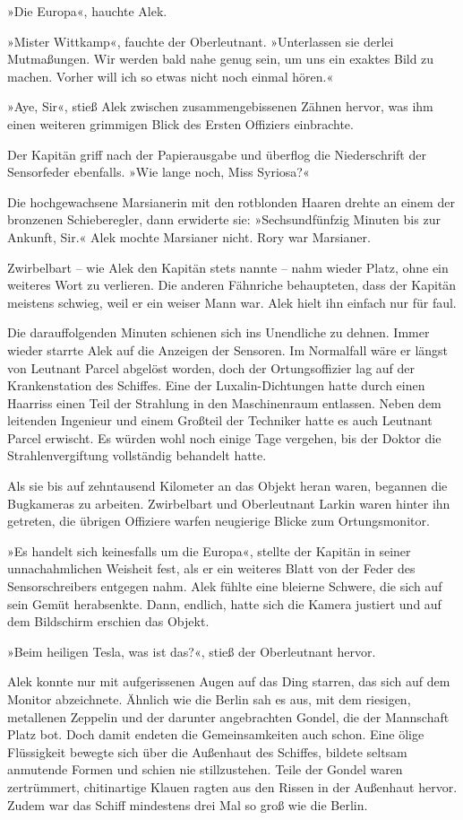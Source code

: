 »Die Europa«, hauchte Alek.

»Mister Wittkamp«, fauchte der Oberleutnant. »Unterlassen sie
derlei Mutmaßungen. Wir werden bald nahe genug sein, um uns ein
exaktes Bild zu machen. Vorher will ich so etwas nicht noch einmal
hören.«

»Aye, Sir«, stieß Alek zwischen zusammengebissenen Zähnen hervor,
was ihm einen weiteren grimmigen Blick des Ersten Offiziers
einbrachte.

Der Kapitän griff nach der Papierausgabe und überflog die
Niederschrift der Sensorfeder ebenfalls. »Wie lange noch, Miss
Syriosa?«

Die hochgewachsene Marsianerin mit den rotblonden Haaren drehte an
einem der bronzenen Schieberegler, dann erwiderte sie:
»Sechsundfünfzig Minuten bis zur Ankunft, Sir.« Alek mochte
Marsianer nicht. Rory war Marsianer.

Zwirbelbart – wie Alek den Kapitän stets nannte – nahm wieder
Platz, ohne ein weiteres Wort zu verlieren. Die anderen Fähnriche
behaupteten, dass der Kapitän meistens schwieg, weil er ein weiser
Mann war. Alek hielt ihn einfach nur für faul.

Die darauffolgenden Minuten schienen sich ins Unendliche zu dehnen.
Immer wieder starrte Alek auf die Anzeigen der Sensoren. Im
Normalfall wäre er längst von Leutnant Parcel abgelöst worden, doch
der Ortungsoffizier lag auf der Krankenstation des Schiffes. Eine
der Luxalin-Dichtungen hatte durch einen Haarriss einen Teil der
Strahlung in den Maschinenraum entlassen. Neben dem leitenden
Ingenieur und einem Großteil der Techniker hatte es auch Leutnant
Parcel erwischt. Es würden wohl noch einige Tage vergehen, bis der
Doktor die Strahlenvergiftung vollständig behandelt hatte.

Als sie bis auf zehntausend Kilometer an das Objekt heran waren,
begannen die Bugkameras zu arbeiten. Zwirbelbart und Oberleutnant
Larkin waren hinter ihn getreten, die übrigen Offiziere warfen
neugierige Blicke zum Ortungsmonitor.

»Es handelt sich keinesfalls um die Europa«, stellte der Kapitän in
seiner unnachahmlichen Weisheit fest, als er ein weiteres Blatt von
der Feder des Sensorschreibers entgegen nahm. Alek fühlte eine
bleierne Schwere, die sich auf sein Gemüt herabsenkte. Dann,
endlich, hatte sich die Kamera justiert und auf dem Bildschirm
erschien das Objekt.

»Beim heiligen Tesla, was ist das?«, stieß der Oberleutnant
hervor.

Alek konnte nur mit aufgerissenen Augen auf das Ding starren, das
sich auf dem Monitor abzeichnete. Ähnlich wie die Berlin sah es
aus, mit dem riesigen, metallenen Zeppelin und der darunter
angebrachten Gondel, die der Mannschaft Platz bot. Doch damit
endeten die Gemeinsamkeiten auch schon. Eine ölige Flüssigkeit
bewegte sich über die Außenhaut des Schiffes, bildete seltsam
anmutende Formen und schien nie stillzustehen. Teile der Gondel
waren zertrümmert, chitinartige Klauen ragten aus den Rissen in der
Außenhaut hervor. Zudem war das Schiff mindestens drei Mal so groß
wie die Berlin.

